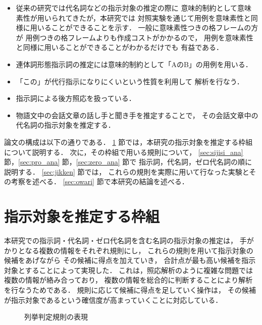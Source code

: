 \begin{itemize}
\item 
従来の研究では代名詞などの指示対象の推定の際に
意味的制約として意味素性が用いられてきたが，本研究では
対照実験を通じて用例を意味素性と同様に用いることができることを示す．
一般に意味素性つきの格フレームの方が
用例つきの格フレームよりも作成コストがかかるので，
用例を意味素性と同様に用いることができることがわかるだけでも
有益である．
\item 
連体詞形態指示詞の推定には意味的制約として「AのB」の用例を用いる．
\item 
「この」が代行指示になりにくいという性質を利用して
解析を行なう．
\item 
指示詞による後方照応を扱っている．
\item 
物語文中の会話文章の話し手と聞き手を推定することで，
その会話文章中の代名詞の指示対象を推定する．
\end{itemize}

論文の構成は以下の通りである．
\ref{wakugumi} 節では，本研究の指示対象を推定する枠組について説明する．
次に，その枠組で用いる規則について，
\ref{sec:sijisi_ana} 節，\ref{sec:pro_ana} 節，\ref{sec:zero_ana} 節で
指示詞，代名詞，ゼロ代名詞の順に説明する．
\ref{sec:jikken} 節では，
これらの規則を実際に用いて行なった実験とその考察を述べる．
\ref{sec:owari} 節で本研究の結論を述べる．

\section{指示対象を推定する枠組}
\label{wakugumi}

本研究での指示詞・代名詞・ゼロ代名詞を含む名詞の指示対象の推定は，
手がかりとなる複数の情報をそれぞれ規則にし，
これらの規則を用いて指示対象の候補をあげながら
その候補に得点を加えていき，
合計点が最も高い候補を指示対象とすることによって実現した．
これは，照応解析のように複雑な問題では複数の情報が絡み合っており，
複数の情報を総合的に判断することにより解析を行なうためである．
規則に応じて候補に得点を足していく操作は，
その候補が指示対象であるという確信度が高まっていくことに対応している．

\begin{figure}[t]
  \begin{center}
    \caption{列挙判定規則の表現}
    \label{fig:kouho_rekkyo}
  \end{center}
\end{figure}

